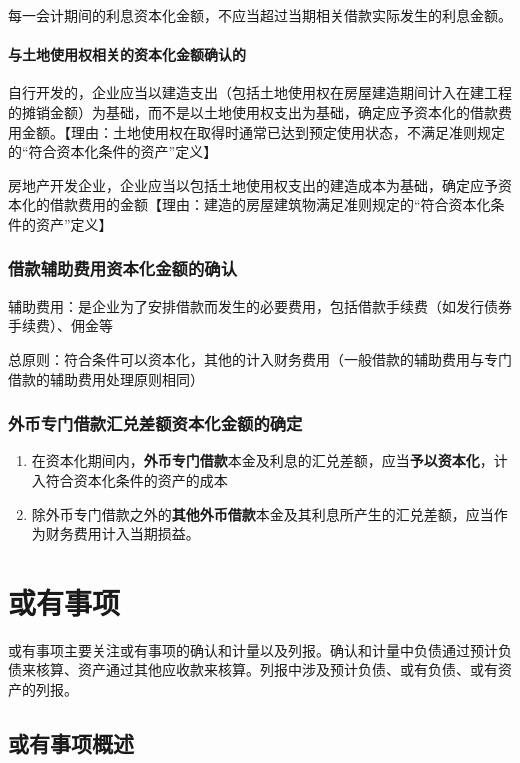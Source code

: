 \documentclass[UTF8,12pt]{ctexart}
\numberwithin{equation}{section} %
\numberwithin{figure}{section}
\numberwithin{table}{section}
\begin{document}
	每一会计期间的利息资本化金额，不应当超过当期相关借款实际发生的利息金额。
	
	\paragraph{与土地使用权相关的资本化金额确认的}
	自行开发的，企业应当以建造支出（包括土地使用权在房屋建造期间计入在建工程的摊销金额）为基础，而不是以土地使用权支出为基础，确定应予资本化的借款费用金额。【理由：土地使用权在取得时通常已达到预定使用状态，不满足准则规定的“符合资本化条件的资产”定义】
	
	房地产开发企业，企业应当以包括土地使用权支出的建造成本为基础，确定应予资本化的借款费用的金额【理由：建造的房屋建筑物满足准则规定的“符合资本化条件的资产”定义】
	
	\subsubsection{借款辅助费用资本化金额的确认}
	
	辅助费用：是企业为了安排借款而发生的必要费用，包括借款手续费（如发行债券手续费）、佣金等
	
	总原则：符合条件可以资本化，其他的计入财务费用（一般借款的辅助费用与专门借款的辅助费用处理原则相同）
	
	\subsubsection{外币专门借款汇兑差额资本化金额的确定}
	
	\begin{enumerate}
		\item 在资本化期间内，\textbf{外币专门借款}本金及利息的汇兑差额，应当\textbf{予以资本化}，计入符合资本化条件的资产的成本
		
		\item 除外币专门借款之外的\textbf{其他外币借款}本金及其利息所产生的汇兑差额，应当作为财务费用计入当期损益。
	\end{enumerate}
	
	\newpage
	\section{或有事项}
	或有事项主要关注或有事项的确认和计量以及列报。确认和计量中负债通过预计负债来核算、资产通过其他应收款来核算。列报中涉及预计负债、或有负债、或有资产的列报。
	
	
	\subsection{或有事项概述}
\end{document}
